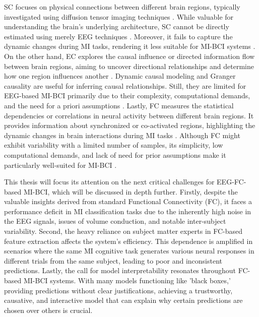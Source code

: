 SC focuses on physical connections between different brain regions, typically investigated using diffusion tensor imaging techniques \cite{yeh2021mapping}. While valuable for understanding the brain's underlying architecture, SC cannot be directly estimated using merely EEG techniques \cite{thiebaut2020brain}. Moreover, it fails to capture the dynamic changes during MI tasks, rendering it less suitable for MI-BCI systems \cite{yeh2021mapping}. On the other hand, EC explores the causal influence or directed information flow between brain regions, aiming to uncover directional relationships and determine how one region influences another \cite{cao2022brain}. Dynamic causal modeling \cite{lee2020predicting} and Granger causality \cite{hejazi2019prediction} are useful for inferring causal relationships. Still, they are limited for EEG-based MI-BCI primarily due to their complexity, computational demands, and the need for a priori assumptions \cite{chiarion2023connectivity}. Lastly, FC measures the statistical dependencies or correlations in neural activity between different brain regions. It provides information about synchronized or co-activated regions, highlighting the dynamic changes in brain interactions during MI tasks \cite{friston2011functional}. Although FC might exhibit variability with a limited number of samples, its simplicity, low computational demands, and lack of need for prior assumptions make it particularly well-suited for MI-BCI \cite{hamedi2016electroencephalographic,he2019electrophysiological,sakkalis2011review}.

This thesis will focus its attention on the next critical challenges for EEG-FC-based MI-BCI, which will be discussed in depth further. Firstly, despite the valuable insights derived from standard Functional Connectivity (FC), it faces a performance deficit in MI classification tasks due to the inherently high noise in the EEG signals, issues of volume conduction, and notable inter-subject variability. Second, the heavy reliance on subject matter experts in FC-based feature extraction affects the system's efficiency. This dependence is amplified in scenarios where the same MI cognitive task generates various neural responses in different trials from the same subject, leading to poor and inconsistent predictions. Lastly, the call for model interpretability resonates throughout FC-based MI-BCI systems. With many models functioning like 'black boxes,' providing predictions without clear justifications, achieving a trustworthy, causative, and interactive model that can explain why certain predictions are chosen over others is crucial.


